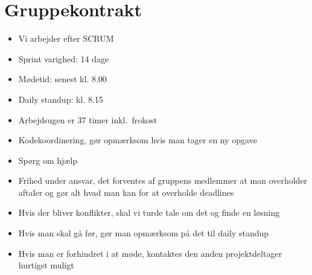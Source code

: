 \section{Gruppekontrakt}
\begin{itemize}
    \item Vi arbejder efter SCRUM
    \item Sprint varighed: 14 dage
    \item Mødetid: senest kl. 8.00
    \item Daily standup: kl. 8.15
    \item Arbejdsugen er 37 timer inkl.\ frokost
    \item Kodekoordinering, gør opmærksom hvis man tager en ny opgave
    \item Spørg om hjælp
    \item Frihed under ansvar, det forventes af gruppens medlemmer at man overholder aftaler og gør alt hvad man kan for at overholde deadlines
    \item Hvis der bliver konflikter, skal vi turde tale om det og finde en løsning
    \item Hvis man skal gå før, gør man opmærksom på det til daily standup
    \item Hvis man er forhindret i at møde, kontaktes den anden projektdeltager hurtigst muligt
\end{itemize}
